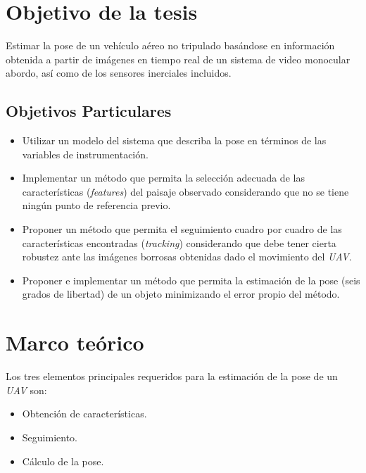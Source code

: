 \documentclass[12pt,letterpaper]{article}
\newlength{\spacing}
\newcommand{\nspace}[1]{\setlength{\baselineskip}{#1\spacing}}
\newenvironment{linespacing}[1]{\nspace{#1}}{}
\begin{document}
\begin{linespacing}{1.5}
\section{Objetivo de la tesis}

Estimar la pose de un vehículo aéreo no tripulado basándose en información obtenida a partir de imágenes en tiempo real de un sistema de video monocular abordo, así como de los sensores inerciales incluidos.

\subsection{Objetivos Particulares}

\begin{itemize}
\item Utilizar un modelo del sistema que describa la pose en términos de las variables de instrumentación.
\item Implementar un método que permita la selección adecuada de las características (\textit{features}) del paisaje observado considerando que no se tiene ningún punto de referencia previo.
\item Proponer un método que permita el seguimiento cuadro por cuadro de las características encontradas (\textit{tracking}) considerando que debe tener cierta robustez ante las imágenes borrosas obtenidas dado el movimiento del \textit{UAV}.
\item Proponer e implementar un método que permita la estimación de la pose (seis grados de libertad) de un objeto minimizando el error propio del método.
\end{itemize}

\section{Marco teórico}

Los tres elementos principales requeridos para la estimación de la pose de un \textit{UAV} son:

\begin{itemize}
\item Obtención de características.
\item Seguimiento.
\item Cálculo de la pose.
\end{itemize}


\end{linespacing}
\end{document}
